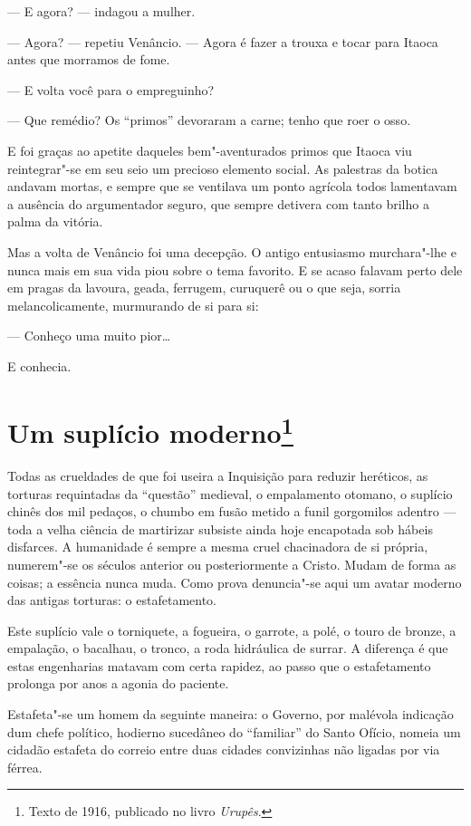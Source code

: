 --- E agora? --- indagou a mulher.

--- Agora? --- repetiu Venâncio. --- Agora é fazer a trouxa e tocar para
Itaoca antes que morramos de fome.

--- E volta você para o empreguinho?

--- Que remédio? Os ``primos'' devoraram a carne; tenho que roer o osso.

E foi graças ao apetite daqueles bem"-aventurados primos que Itaoca viu
reintegrar"-se em seu seio um precioso elemento social. As palestras da
botica andavam mortas, e sempre que se ventilava um ponto agrícola todos
lamentavam a ausência do argumentador seguro, que sempre detivera com
tanto brilho a palma da vitória.

Mas a volta de Venâncio foi uma decepção. O antigo entusiasmo
murchara"-lhe e nunca mais em sua vida piou sobre o tema favorito. E se
acaso falavam perto dele em pragas da lavoura, geada, ferrugem,
curuquerê ou o que seja, sorria melancolicamente, murmurando de si para
si:

--- Conheço uma muito pior\ldots{}

E conhecia.

\chapter{Um suplício moderno\footnote[*]{Texto de 1916, publicado no livro \emph{Urupês}.}}

Todas as crueldades de que foi useira a Inquisição para reduzir
heréticos, as torturas requintadas da ``questão'' medieval, o
empalamento otomano, o suplício chinês dos mil pedaços, o chumbo em
fusão metido a funil gorgomilos adentro --- toda a velha ciência de
martirizar subsiste ainda hoje encapotada sob hábeis disfarces. A
humanidade é sempre a mesma cruel chacinadora de si própria, numerem"-se
os séculos anterior ou posteriormente a Cristo. Mudam de forma as
coisas; a essência nunca muda. Como prova denuncia"-se aqui um avatar
moderno das antigas torturas: o estafetamento.

Este suplício vale o torniquete, a fogueira, o garrote, a polé, o touro
de bronze, a empalação, o bacalhau, o tronco, a roda hidráulica de
surrar. A diferença é que estas engenharias matavam com certa rapidez,
ao passo que o estafetamento prolonga por anos a agonia do paciente.

Estafeta"-se um homem da seguinte maneira: o Governo, por malévola
indicação dum chefe político, hodierno sucedâneo do ``familiar'' do
Santo Ofício, nomeia um cidadão estafeta do correio entre duas cidades
convizinhas não ligadas por via férrea.

